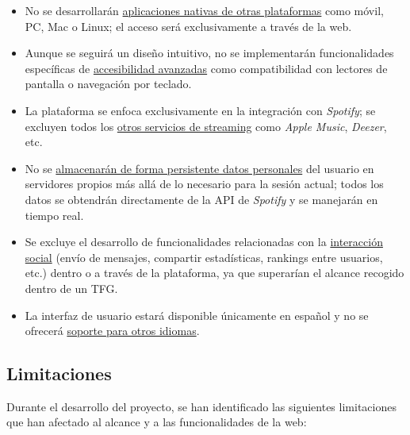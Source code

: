 \begin{itemize}
    \item No se desarrollarán \underline{aplicaciones nativas de otras plataformas} como móvil, PC, Mac o Linux; el acceso será exclusivamente a través de la web.

    \item Aunque se seguirá un diseño intuitivo, no se implementarán funcionalidades específicas de \underline{accesibilidad avanzadas} como compatibilidad con lectores de pantalla o navegación por teclado.

    \item La plataforma se enfoca exclusivamente en la integración con \textit{Spotify}; se excluyen todos los \underline{otros servicios de streaming} como \textit{Apple Music}, \textit{Deezer}, etc.

    \item No se \underline{almacenarán de forma persistente datos personales} del usuario en servidores propios más allá de lo necesario para la sesión actual; todos los datos se obtendrán directamente de la API de \textit{Spotify} y se manejarán en tiempo real.

    \item Se excluye el desarrollo de funcionalidades relacionadas con la \underline{interacción social} (envío de mensajes, compartir estadísticas, rankings entre usuarios, etc.) dentro o a través de la plataforma, ya que superarían el alcance recogido dentro de un TFG.

    \item La interfaz de usuario estará disponible únicamente en español y no se ofrecerá \underline{soporte para otros idiomas}.
\end{itemize}

\subsection{Limitaciones}

Durante el desarrollo del proyecto, se han identificado las siguientes limitaciones que han afectado al alcance y a las funcionalidades de la web:

